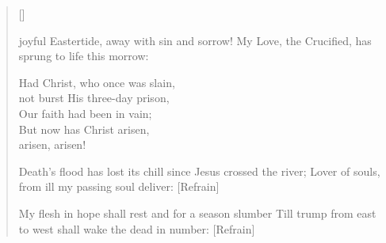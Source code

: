 \newHymn
{}

\begin{verse}[\versewidth]
\begin{indentedVerse}
 joyful Eastertide,
\vin away with sin and sorrow!
My Love, the Crucified,
\vin has sprung to life this morrow:
\end{indentedVerse}

\begin{indentedVerse}
Had Christ, who once was slain,\\
\vin not burst His three-day prison,\\
Our faith had been in vain;\\
But now has Christ arisen,\\
\vin arisen, arisen!
\end{indentedVerse}

\begin{indentedVerse}
Death’s flood has lost its chill
\vin since Jesus crossed the river;
Lover of souls, from ill
\vin my passing soul deliver: [Refrain]
\end{indentedVerse}

\begin{indentedVerse}
My flesh in hope shall rest
\vin and for a season slumber
Till trump from east to west
\vin shall wake the dead in number: [Refrain]
\end{indentedVerse}

\end{verse}



